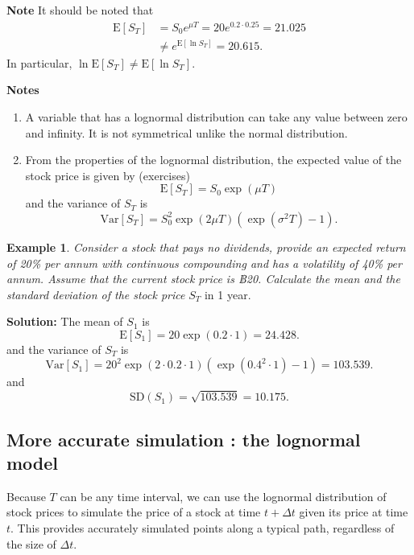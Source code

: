 \documentclass[
]{book}
\theoremstyle{definition}
\theoremstyle{definition}
\newtheorem{example}{Example}[chapter]
\theoremstyle{definition}
\theoremstyle{definition}
\theoremstyle{remark}
\begin{document}
\textbf{Note} It should be noted that \[\begin{aligned}
    \mathrm{E}[S_T] &= S_0 e^{\mu T} = 20 e^{0.2 \cdot 0.25} = 21.025  \\
     &\neq e^{\mathrm{E}[\ln S_T]}  =  20.615.
    \end{aligned}\] In particular,
\(\ln \mathrm{E}[S_T] \neq \mathrm{E}[\ln S_T]\).

\textbf{Notes}

\begin{enumerate}
\def\labelenumi{\arabic{enumi}.}
\item
  A variable that has a lognormal distribution can take any value
  between zero and infinity. It is not symmetrical unlike the normal
  distribution.
\item
  From the properties of the lognormal distribution, the expected
  value of the stock price is given by (exercises)
  \[\mathrm{E}[S_T] = S_0 \exp (\mu T)\] and the variance of \(S_T\) is
  \[\mathrm{Var}[S_T] = S_0^2 \exp(2 \mu T) (\exp(\sigma^2 T) - 1).\]
\end{enumerate}

\begin{example}
\emph{Consider a stock that pays no dividends, provide an expected return of
20\% per annum with continuous compounding and has a volatility of 40\%
per annum. Assume that the current stock price is ฿20. Calculate the
mean and the standard deviation of the stock price} \(S_T\) in 1 year.
\end{example}

\textbf{Solution:} The mean of \(S_1\) is
\[\mathrm{E}[S_1] =  20 \exp (0.2 \cdot 1)  = 24.428.\] and the variance
of \(S_T\) is
\[\mathrm{Var}[S_1] = 20^2 \exp(2 \cdot 0.2 \cdot 1) (\exp(0.4^2 \cdot 1) - 1) = 103.539.\]
and \[\text{SD}(S_1) = \sqrt{ 103.539} = 10.175.\]

\hypertarget{more-accurate-simulation-the-lognormal-model}{%
\subsection{More accurate simulation : the lognormal model}\label{more-accurate-simulation-the-lognormal-model}}

Because \(T\) can be any time interval, we can use the lognormal
distribution of stock prices to simulate the price of a stock at time
\(t + \Delta t\) given its price at time \(t\). This provides accurately
simulated points along a typical path, regardless of the size of
\(\Delta t\).
\end{document}

